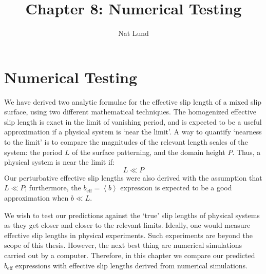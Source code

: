 \documentclass[12pt, a4paper, twoside, openright]{book}
\title{Chapter 8: Numerical Testing}
\author{Nat Lund}
\newcommand{\beff}{\ensuremath{b_{\mathrm{eff}}}}
\newcommand{\bmin}{\ensuremath{b_{\mathrm{min}}}}
\newcommand{\beffm}{\ensuremath{b_{\mathrm{eff}}} = \left< b \right> }
\begin{document}
\chapter{Numerical Testing}\label{C:numerics}

We have derived two analytic formulae for the effective slip length of a mixed slip surface, using two different mathematical techniques.
The homogenized effective slip length is exact in the limit of vanishing period, and is expected to be a useful approximation if a physical system is `near the limit'.
A way to quantify `nearness to the limit' is to
compare the magnitudes of the relevant length scales of the system: the period $L$ of the surface patterning, and the domain height $P$.  Thus, a physical system is near the limit if:
\begin{equation}
L \ll P
\end{equation}
Our perturbative effective slip lengths were also derived with the assumption that $L \ll P$; furthermore, the $\beffm$ expression is expected to be a good approximation when $b \ll  L$.

We wish to test our predictions against the `true' slip lengths of physical systems as they get closer and closer to the relevant limits.
Ideally, one would measure effective slip lengths in physical experiments.  
Such experiments are beyond the scope of this thesis.  However, the next best thing are numerical simulations carried out by a computer.  Therefore, in this chapter we compare our predicted $\beff$ expressions with effective slip lengths derived from numerical simulations.




\end{document}
